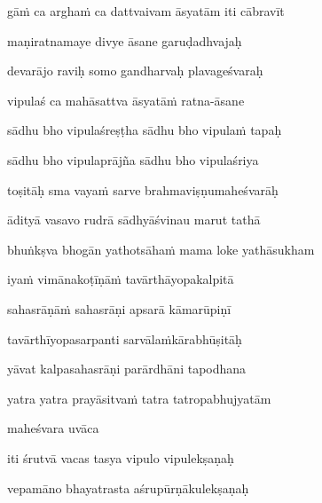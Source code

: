 gā\.m ca argha\.m ca dattvaivam āsyatām iti cābravīt \veg\dontdisplaylinenum

maṇiratnamaye divye āsane garuḍadhvajaḥ\thinspace{\dandab} \dontdisplaylinenum

devarājo raviḥ somo gandharvaḥ plavageśvaraḥ \veg\dontdisplaylinenum

vipulaś ca mahāsattva āsyatā\.m ratna-āsane\thinspace{\dandab} \dontdisplaylinenum

sādhu bho vipulaśreṣṭha sādhu bho vipula\.m tapaḥ \veg\dontdisplaylinenum

sādhu bho vipulaprājña sādhu bho vipulaśriya\thinspace{\dandab} \dontdisplaylinenum

toṣitāḥ sma vaya\.m sarve brahmaviṣṇumaheśvarāḥ \veg\dontdisplaylinenum

ādityā vasavo rudrā sādhyāśvinau marut tathā\thinspace{\dandab} \dontdisplaylinenum

bhuṅkṣva bhogān yathotsāha\.m mama loke yathāsukham \veg\dontdisplaylinenum

iya\.m vimānakoṭīṇā\.m tavārthāyopakalpitā\thinspace{\dandab} \dontdisplaylinenum

sahasrāṇā\.m sahasrāṇi apsarā kāmarūpiṇī \veg\dontdisplaylinenum

tavārthīyopasarpanti sarvāla\.mkārabhūṣitāḥ\thinspace{\dandab} \dontdisplaylinenum

yāvat kalpasahasrāṇi parārdhāni tapodhana \danda\dontdisplaylinenum

yatra yatra prayāsitva\.m tatra tatropabhujyatām \veg\dontdisplaylinenum

maheśvara uvāca~{\dandab}\dontdisplaylinenum 

iti śrutvā vacas tasya vipulo vipulekṣaṇaḥ\thinspace{\danda} \dontdisplaylinenum

vepamāno bhayatrasta aśrupūrṇākulekṣaṇaḥ \veg\dontdisplaylinenum

